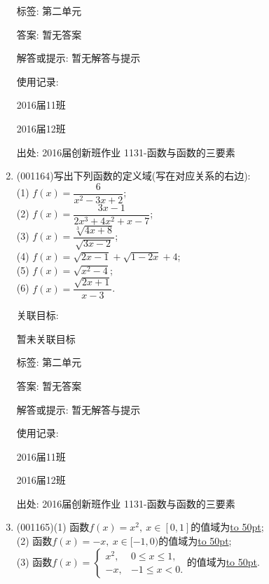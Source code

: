 \documentclass[10pt,a4paper]{article}
\newcommand{\blank}[1]{\underline{\hbox to #1pt{}}}
\begin{document}
\begin{enumerate}[1.]
标签: 第二单元

答案: 暂无答案

解答或提示: 暂无解答与提示

使用记录:

2016届11班	

2016届12班	


出处: 2016届创新班作业	1131-函数与函数的三要素
\item { (001164)}写出下列函数的定义域(写在对应关系的右边):\\ 
(1) $f(x)=\dfrac{6}{x^2-3x+2}$;\\ 
(2) $f(x)=\dfrac{3x-1}{2x^3+4x^2+x-7}$;\\ 
(3) $f(x)=\dfrac{\sqrt[3]{4x+8}}{\sqrt{3x-2}}$;\\ 
(4) $f(x)=\sqrt{2x-1}+\sqrt{1-2x}+4$;\\ 
(5) $f(x)=\sqrt{x^2-4}$;\\ 
(6) $f(x)=\dfrac{\sqrt{2x+1}}{x-3}$.


关联目标:

暂未关联目标



标签: 第二单元

答案: 暂无答案

解答或提示: 暂无解答与提示

使用记录:

2016届11班						

2016届12班						


出处: 2016届创新班作业	1131-函数与函数的三要素
\item { (001165)}(1) 函数$f(x)=x^2, \ x \in [0,1]$的值域为\blank{50};\\ 
(2) 函数$f(x)=-x, \ x \in [-1,0)$的值域为\blank{50};\\ 
(3) 函数$f(x)=\left\{\begin{array}{cc}x^2,&0\le x\le 1,\\-x,&-1\le x<0.\end{array}\right.$的值域为\blank{50}.



\end{enumerate}
\end{document}
